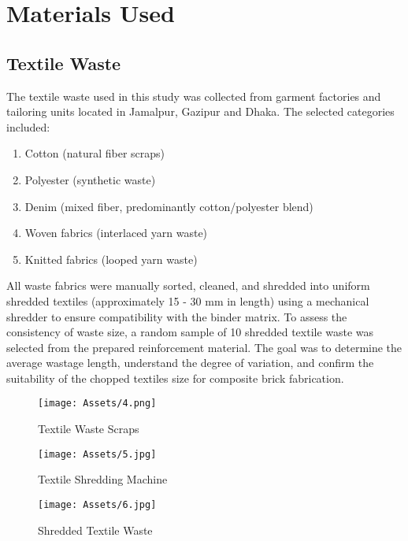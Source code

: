 \section{Materials Used}

\subsection{Textile Waste}
The textile waste used in this study was collected from garment factories and tailoring units located in Jamalpur, Gazipur and Dhaka. The selected categories included:

\begin{enumerate}
	\item Cotton (natural fiber scraps)
	\item Polyester (synthetic waste)
	\item Denim (mixed fiber, predominantly cotton/polyester blend)
	\item Woven fabrics (interlaced yarn waste)
	\item Knitted fabrics (looped yarn waste)
\end{enumerate}

\noindent All waste fabrics were manually sorted, cleaned, and shredded into uniform shredded textiles (approximately 15 - 30 mm in length) using a mechanical shredder to ensure compatibility with the binder matrix. To assess the consistency of waste size, a random sample of 10 shredded textile waste was selected from the prepared reinforcement material. The goal was to determine the average wastage length, understand the degree of variation, and confirm the suitability of the chopped textiles size for composite brick fabrication.
\vspace{12pt}
\begin{figure}[H]
	\centering
	\texttt{[image: Assets/4.png]}
	\caption{Textile Waste Scraps}
	\label{fig:placeholder}
\end{figure}

\begin{figure}[H]
	\centering
	\texttt{[image: Assets/5.jpg]}
	\caption{Textile Shredding Machine}
	\label{fig:placeholder}
\end{figure}

\begin{figure}[H]
	\centering
	\texttt{[image: Assets/6.jpg]}
	\caption{Shredded Textile Waste}
	\label{fig:placeholder}
\end{figure}

